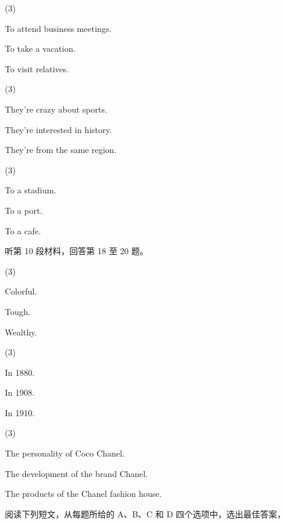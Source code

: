 \documentclass{英语试卷}
\begin{document}
\begin{choices}(3)
  \item To attend business meetings.
  \item To take a vacation.
  \item To visit relatives.
\end{choices}
\begin{choices}(3)
  \item They're crazy about sports.
  \item They're interested in history.
  \item They're from the same region.
\end{choices}
\begin{choices}(3)
  \item To a stadium.
  \item To a port.
  \item To a cafe.
\end{choices}
\par 听第 10 段材料，回答第 18 至 20 题。\par
{}
\begin{choices}(3)
  \item Colorful.
  \item Tough.
  \item Wealthy.
\end{choices}
\begin{choices}(3)
  \item In 1880.
  \item In 1908.
  \item In 1910.
\end{choices}
\begin{choices}(3)
  \item The personality of Coco Chanel.
  \item The development of the brand Chanel.
  \item The products of the Chanel fashion house.
\end{choices}
\par 阅读下列短文，从每题所给的 A、B、C 和 D 四个选项中，选出最佳答案，\par
\end{document}
